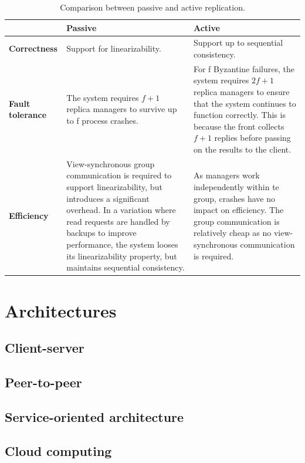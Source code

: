 \begin{table}
	\caption{Comparison between passive and active replication.}
	\label{tab:compare:replication:faulttolerance}
	\begin{tabular}{p{80px} | p{155px} | p{155px}}
															& \textbf{Passive} & \textbf{Active} \\
		\hline
		\textbf{Correctness} 			& Support for linearizability. & Support up to sequential consistency. \\
		\textbf{Fault tolerance} 	& The system requires $f+1$ replica managers to survive up to f process crashes. & For f Byzantine failures, the system requires $2f+1$ replica managers to ensure that the system continues to function correctly. This is because the front collects $f+1$ replies before passing on the results to the client. \\
		\textbf{Efficiency} 			& View-synchronous group communication is required to support linearizability, but introduces a significant overhead. In a variation where read requests are handled by backups to improve performance, the system looses its linearizability property, but maintains sequential consistency. & As managers work independently within te group, crashes have no impact on efficiency. The group communication is relatively cheap as no view-synchronous communication is required. \\
		\hline
	\end{tabular}
\end{table}






\section{Architectures}

\subsection{Client-server}


\subsection{Peer-to-peer}


\subsection{Service-oriented architecture}


\subsection{Cloud computing}


















